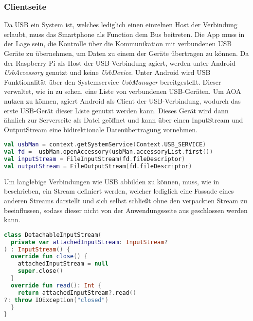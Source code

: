     \subsubsection{Clientseite}
        Da USB ein System ist, welches lediglich einen einzelnen Host der Verbindung erlaubt, muss das Smartphone als Function dem Bus beitreten. Die App muss in der Lage sein, die Kontrolle über die Kommunikation mit verbundenen USB Geräte zu übernehmen, um Daten zu einem der Geräte übertragen zu können. Da der Raspberry Pi als Host der USB-Verbindung agiert, werden unter Android {\it UsbAccessory} genutzt und keine {\it UsbDevice}.
        Unter Android wird USB Funktionalität über den Systemservice {\it UsbManager} bereitgestellt. Dieser verwaltet, wie in  zu sehen, eine Liste von verbundenen USB-Geräten. Um AOA nutzen zu können, agiert Android als Client der USB-Verbindung, wodurch das erste USB-Gerät dieser Liste genutzt werden kann. Dieses Gerät wird dann ähnlich zur Serverseite als Datei geöffnet und kann über einen InputStream und OutputStream eine bidirektionale Datenübertragung vornehmen.
        \begin{lstlisting}[frame=bt, label={lst:usb:client}, language=Kotlin, caption=Verbindungsaufbau über USB (Clientcode in Kotlin)]
val usbMan = context.getSystemService(Context.USB_SERVICE)
val fd =  usbMan.openAccessory(usbMan.accessoryList.first())
val inputStream = FileInputStream(fd.fileDescriptor)
val outputStream = FileOutputStream(fd.fileDescriptor)
        \end{lstlisting}

        Um langlebige Verbindungen wie USB abbilden zu können, muss, wie in  beschrieben, ein Stream definiert werden, welcher lediglich eine Fassade eines anderen Streams darstellt und sich selbst schließt ohne den verpackten Stream zu beeinflussen, sodass dieser nicht von der Anwendungsseite aus geschlossen werden kann.
\pagebreak
        \begin{lstlisting}[frame=bt, label={lst:usb:socket}, language=Kotlin, caption=Socketwrapper für USB (Clientcode in Kotlin)]
class DetachableInputStream(
  private var attachedInputStream: InputStream?
) : InputStream() {
  override fun close() {
    attachedInputStream = null
    super.close()
  }
  override fun read(): Int {
    return attachedInputStream?.read()
?: throw IOException("closed")
  }
}
        \end{lstlisting}
        
